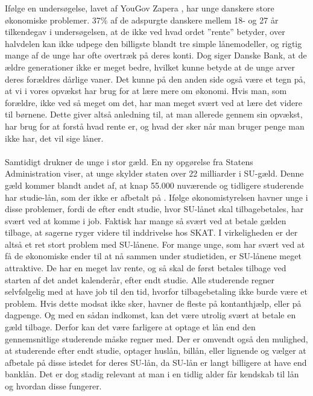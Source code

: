  Ifølge en undersøgelse, lavet af YouGov Zapera \cite{DanskeB1}, har unge danskere store økonomiske problemer. 37\% af de adspurgte danskere mellem 18- og 27 år tilkendegav i undersøgelsen, at de ikke ved hvad ordet ”rente” betyder, over halvdelen kan ikke udpege den billigste blandt tre simple lånemodeller, og rigtig mange af de unge har ofte overtræk på deres konti. Dog siger Danske Bank, at de ældre generationer ikke er meget bedre, hvilket kunne betyde at de unge arver deres forældres dårlige vaner. Det kunne på den anden side også være et tegn på, at vi i vores opvækst har brug for at lære mere om økonomi. Hvis man, som forældre, ikke ved så meget om det, har man meget svært ved at lære det videre til børnene. Dette giver altså anledning til, at man allerede gennem sin opvækst, har brug for at forstå hvad rente er, og hvad der sker når man bruger penge man ikke har, det vil sige låner.    \\
\\
Samtidigt drukner de unge i stor gæld. En ny opgørelse fra Statens Administration viser, at unge skylder staten over 22 milliarder i SU-gæld. Denne gæld kommer blandt andet af, at knap 55.000 nuværende og tidligere studerende har studie-lån, som der ikke er afbetalt på \cite{dr.dk} . Ifølge økonomistyrelsen havner unge i disse problemer, fordi de efter endt studie, hvor SU-lånet skal tilbagebetales, har svært ved at komme i job\cite{jobindex}. Faktisk har mange så svært ved at betale gælden tilbage, at sagerne ryger videre til inddrivelse hos SKAT\cite{BusinessDK1}. I virkeligheden er der altså et ret stort problem med SU-lånene. For mange unge, som har svært ved at få de økonomiske ender til at nå sammen under studietiden, er SU-lånene meget attraktive. De har en meget lav rente, og så skal de først betales tilbage ved starten af det andet kalenderår, efter endt studie. Alle studerende regner selvfølgelig med at have job til den tid, hvorfor tilbagebetaling ikke burde være et problem. Hvis dette modsat ikke sker, havner de fleste på kontanthjælp, eller på dagpenge. Og med en sådan indkomst, kan det være utrolig svært at betale en gæld tilbage. Derfor kan det være farligere at optage et lån end den gennemsnitlige studerende måske regner med. Der er omvendt også den mulighed, at studerende efter endt studie, optager huslån, billån, eller lignende og vælger at afbetale på disse istedet for deres SU-lån, da SU-lån er langt billigere at have end banklån. Det er dog stadig relevant at man i en tidlig alder får kendskab til lån og hvordan disse fungerer.  \\
